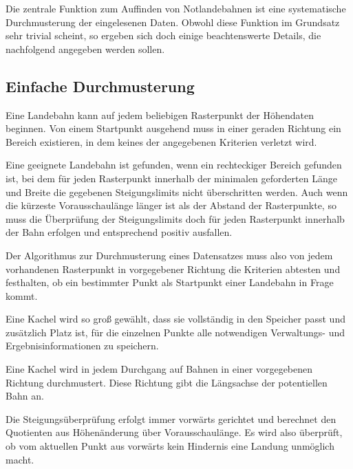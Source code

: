 \documentclass[
11pt, %
a4paper, %
oneside, %
pdfspacing, %
headinclude,
BCOR5mm, %
ngerman, %
bibtotocnumbered,
]{scrartcl}
\begin{document}
Die zentrale Funktion zum Auffinden von Notlandebahnen ist eine systematische Durchmusterung der eingelesenen Daten. Obwohl diese Funktion im Grundsatz sehr trivial scheint, so ergeben sich doch einige beachtenswerte Details, die nachfolgend angegeben werden sollen.

\subsection{Einfache Durchmusterung}\label{Einfache_Durchmusterung}
Eine Landebahn kann auf jedem beliebigen Rasterpunkt der Höhendaten beginnen. Von einem Startpunkt ausgehend muss in einer geraden Richtung ein Bereich existieren, in dem keines der angegebenen Kriterien verletzt wird. 

Eine geeignete Landebahn ist gefunden, wenn ein rechteckiger Bereich gefunden ist, bei dem für jeden Rasterpunkt innerhalb der minimalen geforderten Länge und Breite die gegebenen Steigungslimits nicht überschritten werden.
Auch wenn die kürzeste Vorausschaulänge länger ist als der Abstand der Rasterpunkte, so muss die Überprüfung der Steigungslimits doch für jeden Rasterpunkt innerhalb der Bahn erfolgen und entsprechend positiv ausfallen.

Der Algorithmus zur Durchmusterung eines Datensatzes muss also von jedem vorhandenen Rasterpunkt in vorgegebener Richtung die Kriterien abtesten und festhalten, ob ein bestimmter Punkt als Startpunkt einer Landebahn in Frage kommt.

Eine Kachel wird so groß gewählt, dass sie vollständig in den Speicher passt und zusätzlich Platz ist, für die einzelnen Punkte alle notwendigen Verwaltungs- und Ergebnisinformationen zu speichern.

Eine Kachel wird in jedem Durchgang auf Bahnen in einer vorgegebenen Richtung durchmustert. Diese Richtung gibt die Längsachse der potentiellen Bahn an.

Die Steigungsüberprüfung erfolgt immer vorwärts gerichtet und berechnet den Quotienten aus Höhenänderung über Vorausschaulänge. Es wird also überprüft, ob vom aktuellen Punkt aus vorwärts kein Hindernis eine Landung unmöglich macht.
\end{document}
